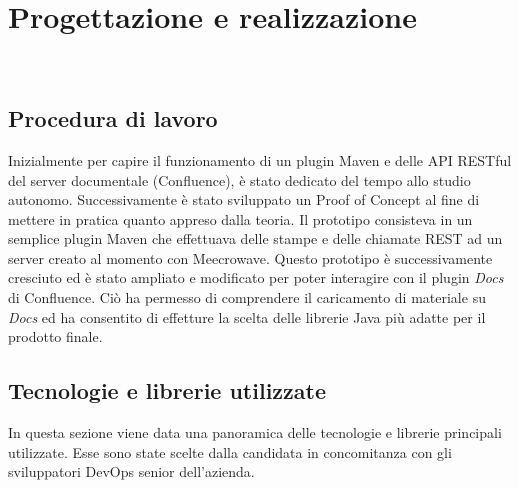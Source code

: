 
\chapter{Progettazione e realizzazione} %
\label{cap:progettazione}

\\

\section{Procedura di lavoro}
Inizialmente per capire il funzionamento di un plugin Maven e delle API RESTful del server documentale (Confluence), è stato dedicato del tempo allo studio autonomo.
Successivamente è stato sviluppato un Proof of Concept al fine di mettere in pratica quanto appreso dalla teoria.
Il prototipo consisteva in un semplice plugin Maven che effettuava delle stampe e delle chiamate REST ad un server creato al momento con Meecrowave.
Questo prototipo è successivamente cresciuto ed è stato ampliato e modificato per poter interagire con il plugin \emph{Docs} di Confluence.
Ciò ha permesso di comprendere il caricamento di materiale su \emph{Docs} ed ha consentito di effetture la scelta delle librerie Java più adatte per il prodotto finale.


\section{Tecnologie e librerie utilizzate}
\label{sec:tecnologie-strumenti}

In questa sezione viene data una panoramica delle tecnologie e librerie principali utilizzate.
Esse sono state scelte dalla candidata in concomitanza con gli sviluppatori DevOps senior dell'azienda.


